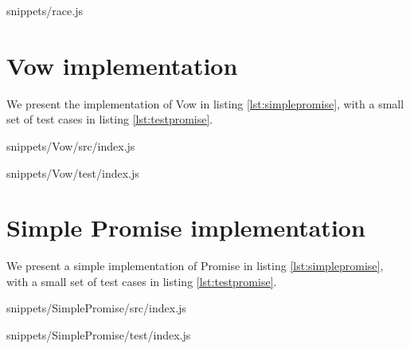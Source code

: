             {snippets/race.js}






\vfill\eject
\appendix

\section{Vow implementation} \label{section:voximpl}

We present the implementation of Vow in listing \ref{lst:simplepromise}, with a small set of test cases in listing \ref{lst:testpromise}.

             {snippets/Vow/src/index.js}


             {snippets/Vow/test/index.js}

\section{Simple Promise implementation} \label{section:spimpl}

We present a simple implementation of Promise in listing \ref{lst:simplepromise}, with a small set of test cases in listing \ref{lst:testpromise}.

             {snippets/SimplePromise/src/index.js}


             {snippets/SimplePromise/test/index.js}




















